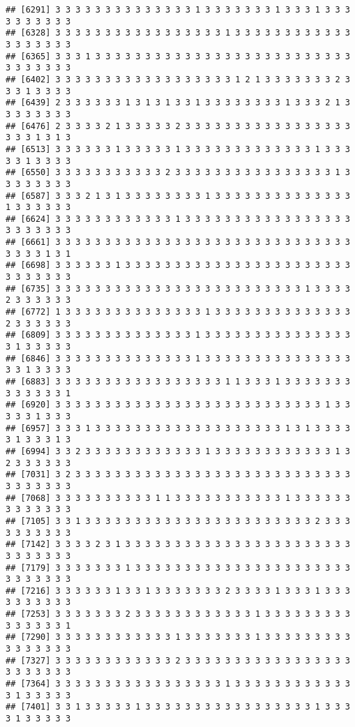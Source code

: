 \documentclass[
]{article}
\begin{document}
\begin{verbatim}
## [6291] 3 3 3 3 3 3 3 3 3 3 3 3 3 3 1 3 3 3 3 3 3 3 1 3 3 3 1 3 3 3 3 3 3 3 3 3 3
## [6328] 3 3 3 3 3 3 3 3 3 3 3 3 3 3 3 3 3 1 3 3 3 3 3 3 3 3 3 3 3 3 3 3 3 3 3 3 3
## [6365] 3 3 3 1 3 3 3 3 3 3 3 3 3 3 3 3 3 3 3 3 3 3 3 3 3 3 3 3 3 3 3 3 3 3 3 3 3
## [6402] 3 3 3 3 3 3 3 3 3 3 3 3 3 3 3 3 3 3 1 2 1 3 3 3 3 3 3 3 2 3 3 3 1 3 3 3 3
## [6439] 2 3 3 3 3 3 3 1 3 1 3 1 3 3 1 3 3 3 3 3 3 3 3 1 3 3 3 2 1 3 3 3 3 3 3 3 3
## [6476] 2 3 3 3 3 2 1 3 3 3 3 3 2 3 3 3 3 3 3 3 3 3 3 3 3 3 3 3 3 3 3 3 3 1 3 1 3
## [6513] 3 3 3 3 3 3 1 3 3 3 3 3 1 3 3 3 3 3 3 3 3 3 3 3 3 3 1 3 3 3 3 3 1 3 3 3 3
## [6550] 3 3 3 3 3 3 3 3 3 3 3 2 3 3 3 3 3 3 3 3 3 3 3 3 3 3 3 3 1 3 3 3 3 3 3 3 3
## [6587] 3 3 3 2 1 3 1 3 3 3 3 3 3 3 3 1 3 3 3 3 3 3 3 3 3 3 3 3 3 3 1 3 3 3 3 3 3
## [6624] 3 3 3 3 3 3 3 3 3 3 3 3 1 3 3 3 3 3 3 3 3 3 3 3 3 3 3 3 3 3 3 3 3 3 3 3 3
## [6661] 3 3 3 3 3 3 3 3 3 3 3 3 3 3 3 3 3 3 3 3 3 3 3 3 3 3 3 3 3 3 3 3 3 3 1 3 1
## [6698] 3 3 3 3 3 3 1 3 3 3 3 3 3 3 3 3 3 3 3 3 3 3 3 3 3 3 3 3 3 3 3 3 3 3 3 3 3
## [6735] 3 3 3 3 3 3 3 3 3 3 3 3 3 3 3 3 3 3 3 3 3 3 3 3 3 1 3 3 3 3 2 3 3 3 3 3 3
## [6772] 1 3 3 3 3 3 3 3 3 3 3 3 3 3 3 1 3 3 3 3 3 3 3 3 3 3 3 3 3 3 2 3 3 3 3 3 3
## [6809] 3 3 3 3 3 3 3 3 3 3 3 3 3 3 1 3 3 3 3 3 3 3 3 3 3 3 3 3 3 3 3 1 3 3 3 3 3
## [6846] 3 3 3 3 3 3 3 3 3 3 3 3 3 3 1 3 3 3 3 3 3 3 3 3 3 3 3 3 3 3 3 3 1 3 3 3 3
## [6883] 3 3 3 3 3 3 3 3 3 3 3 3 3 3 3 3 3 1 1 3 3 3 1 3 3 3 3 3 3 3 3 3 3 3 3 3 1
## [6920] 3 3 3 3 3 3 3 3 3 3 3 3 3 3 3 3 3 3 3 3 3 3 3 3 3 3 3 1 3 3 3 3 3 1 3 3 3
## [6957] 3 3 3 1 3 3 3 3 3 3 3 3 3 3 3 3 3 3 3 3 3 3 3 1 3 1 3 3 3 3 3 1 3 3 3 1 3
## [6994] 3 3 2 3 3 3 3 3 3 3 3 3 3 3 3 1 3 3 3 3 3 3 3 3 3 3 3 3 1 3 2 3 3 3 3 3 3
## [7031] 3 2 3 3 3 3 3 3 3 3 3 3 3 3 3 3 3 3 3 3 3 3 3 3 3 3 3 3 3 3 3 3 3 3 3 3 3
## [7068] 3 3 3 3 3 3 3 3 3 3 1 1 3 3 3 3 3 3 3 3 3 3 3 1 3 3 3 3 3 3 3 3 3 3 3 3 3
## [7105] 3 3 1 3 3 3 3 3 3 3 3 3 3 3 3 3 3 3 3 3 3 3 3 3 3 3 2 3 3 3 3 3 3 3 3 3 3
## [7142] 3 3 3 3 2 3 1 3 3 3 3 3 3 3 3 3 3 3 3 3 3 3 3 3 3 3 3 3 3 3 3 3 3 3 3 3 3
## [7179] 3 3 3 3 3 3 3 1 3 3 3 3 3 3 3 3 3 3 3 3 3 3 3 3 3 3 3 3 3 3 3 3 3 3 3 3 3
## [7216] 3 3 3 3 3 3 1 3 3 1 3 3 3 3 3 3 3 2 3 3 3 3 1 3 3 3 1 3 3 3 3 3 3 3 3 3 3
## [7253] 3 3 3 3 3 3 3 2 3 3 3 3 3 3 3 3 3 3 3 3 1 3 3 3 3 3 3 3 3 3 3 3 3 3 3 3 1
## [7290] 3 3 3 3 3 3 3 3 3 3 3 3 1 3 3 3 3 3 3 3 1 3 3 3 3 3 3 3 3 3 3 3 3 3 3 3 3
## [7327] 3 3 3 3 3 3 3 3 3 3 3 3 2 3 3 3 3 3 3 3 3 3 3 3 3 3 3 3 3 3 3 3 3 3 3 3 3
## [7364] 3 3 3 3 3 3 3 3 3 3 3 3 3 3 3 3 3 1 3 3 3 3 3 3 3 3 3 3 3 3 3 1 3 3 3 3 3
## [7401] 3 3 1 3 3 3 3 3 1 3 3 3 3 3 3 3 3 3 3 3 3 3 3 3 3 3 1 3 3 3 3 1 3 3 3 3 3

\end{verbatim}
\end{document}

